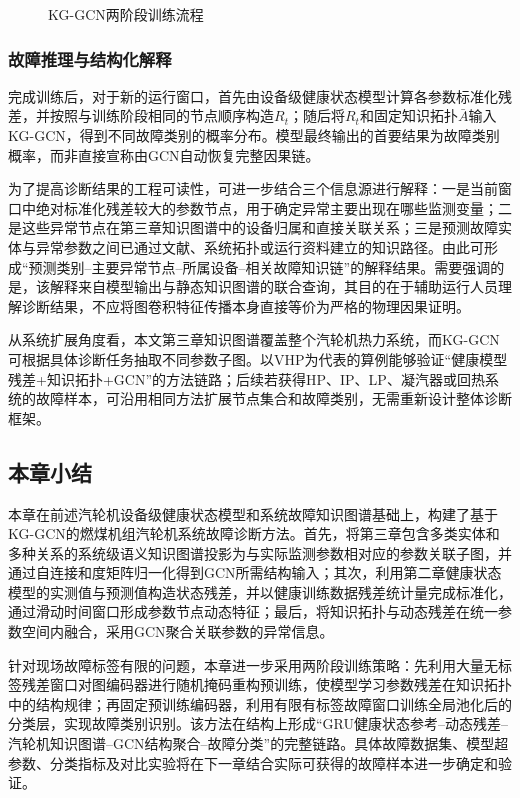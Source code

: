 \begin{figure}[htbp]
    \centering
    \caption{KG-GCN两阶段训练流程}
    \label{fig:kg_gcn_training}
\end{figure}

\subsubsection{故障推理与结构化解释}

完成训练后，对于新的运行窗口，首先由设备级健康状态模型计算各参数标准化残差，并按照与训练阶段相同的节点顺序构造$R_t$；随后将$R_t$和固定知识拓扑$\bar A$输入KG-GCN，得到不同故障类别的概率分布。模型最终输出的首要结果为故障类别概率，而非直接宣称由GCN自动恢复完整因果链。

为了提高诊断结果的工程可读性，可进一步结合三个信息源进行解释：一是当前窗口中绝对标准化残差较大的参数节点，用于确定异常主要出现在哪些监测变量；二是这些异常节点在第三章知识图谱中的设备归属和直接关联关系；三是预测故障实体与异常参数之间已通过文献、系统拓扑或运行资料建立的知识路径。由此可形成“预测类别--主要异常节点--所属设备--相关故障知识链”的解释结果。需要强调的是，该解释来自模型输出与静态知识图谱的联合查询，其目的在于辅助运行人员理解诊断结果，不应将图卷积特征传播本身直接等价为严格的物理因果证明。

从系统扩展角度看，本文第三章知识图谱覆盖整个汽轮机热力系统，而KG-GCN可根据具体诊断任务抽取不同参数子图。以VHP为代表的算例能够验证“健康模型残差+知识拓扑+GCN”的方法链路；后续若获得HP、IP、LP、凝汽器或回热系统的故障样本，可沿用相同方法扩展节点集合和故障类别，无需重新设计整体诊断框架。

\subsection{本章小结}

本章在前述汽轮机设备级健康状态模型和系统故障知识图谱基础上，构建了基于KG-GCN的燃煤机组汽轮机系统故障诊断方法。首先，将第三章包含多类实体和多种关系的系统级语义知识图谱投影为与实际监测参数相对应的参数关联子图，并通过自连接和度矩阵归一化得到GCN所需结构输入；其次，利用第二章健康状态模型的实测值与预测值构造状态残差，并以健康训练数据残差统计量完成标准化，通过滑动时间窗口形成参数节点动态特征；最后，将知识拓扑与动态残差在统一参数空间内融合，采用GCN聚合关联参数的异常信息。

针对现场故障标签有限的问题，本章进一步采用两阶段训练策略：先利用大量无标签残差窗口对图编码器进行随机掩码重构预训练，使模型学习参数残差在知识拓扑中的结构规律；再固定预训练编码器，利用有限有标签故障窗口训练全局池化后的分类层，实现故障类别识别。该方法在结构上形成“GRU健康状态参考--动态残差--汽轮机知识图谱--GCN结构聚合--故障分类”的完整链路。具体故障数据集、模型超参数、分类指标及对比实验将在下一章结合实际可获得的故障样本进一步确定和验证。
